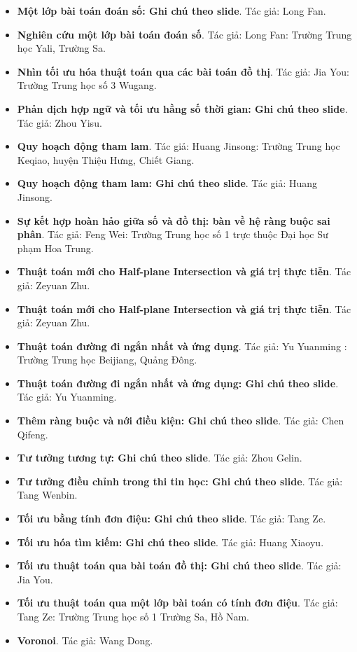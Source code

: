 \documentclass[11pt]{article}
\begin{document}
\begin{itemize}[leftmargin=2em]
  \item \textbf{Một lớp bài toán đoán số: Ghi chú theo slide}. Tác giả: Long Fan.
  \item \textbf{Nghiên cứu một lớp bài toán đoán số}. Tác giả: Long Fan: Trường Trung học Yali, Trường Sa.
  \item \textbf{Nhìn tối ưu hóa thuật toán qua các bài toán đồ thị}. Tác giả: Jia You: Trường Trung học số 3 Wugang.
  \item \textbf{Phản dịch hợp ngữ và tối ưu hằng số thời gian: Ghi chú theo slide}. Tác giả: Zhou Yisu.
  \item \textbf{Quy hoạch động tham lam}. Tác giả: Huang Jinsong: Trường Trung học Keqiao, huyện Thiệu Hưng, Chiết Giang.
  \item \textbf{Quy hoạch động tham lam: Ghi chú theo slide}. Tác giả: Huang Jinsong.
  \item \textbf{Sự kết hợp hoàn hảo giữa số và đồ thị: bàn về hệ ràng buộc sai phân}. Tác giả: Feng Wei: Trường Trung học số 1 trực thuộc Đại học Sư phạm Hoa Trung.
  \item \textbf{Thuật toán mới cho Half-plane Intersection và giá trị thực tiễn}. Tác giả: Zeyuan Zhu.
  \item \textbf{Thuật toán mới cho Half-plane Intersection và giá trị thực tiễn}. Tác giả: Zeyuan Zhu.
  \item \textbf{Thuật toán đường đi ngắn nhất và ứng dụng}. Tác giả: Yu Yuanming : Trường Trung học Beijiang, Quảng Đông.
  \item \textbf{Thuật toán đường đi ngắn nhất và ứng dụng: Ghi chú theo slide}. Tác giả: Yu Yuanming.
  \item \textbf{Thêm ràng buộc và nới điều kiện: Ghi chú theo slide}. Tác giả: Chen Qifeng.
  \item \textbf{Tư tưởng tương tự: Ghi chú theo slide}. Tác giả: Zhou Gelin.
  \item \textbf{Tư tưởng điều chỉnh trong thi tin học: Ghi chú theo slide}. Tác giả: Tang Wenbin.
  \item \textbf{Tối ưu bằng tính đơn điệu: Ghi chú theo slide}. Tác giả: Tang Ze.
  \item \textbf{Tối ưu hóa tìm kiếm: Ghi chú theo slide}. Tác giả: Huang Xiaoyu.
  \item \textbf{Tối ưu thuật toán qua bài toán đồ thị: Ghi chú theo slide}. Tác giả: Jia You.
  \item \textbf{Tối ưu thuật toán qua một lớp bài toán có tính đơn điệu}. Tác giả: Tang Ze: Trường Trung học số 1 Trường Sa, Hồ Nam.
  \item \textbf{Voronoi}. Tác giả: Wang Dong.

\end{itemize}
\end{document}
